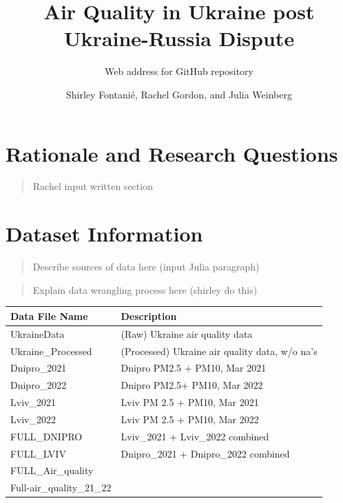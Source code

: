 \documentclass[
  12pt,
]{article}
\title{Air Quality in Ukraine post Ukraine-Russia Dispute}
\subtitle{Web address for GitHub repository}
\author{Shirley Fontanié, Rachel Gordon, and Julia Weinberg}
\date{}
\begin{document}
\maketitle

\newpage
\tableofcontents 
\newpage
\listoftables 
\newpage
\listoffigures 
\newpage

\hypertarget{rationale-and-research-questions}{%
\section{Rationale and Research
Questions}\label{rationale-and-research-questions}}

\begin{quote}
Rachel input written section
\end{quote}

\newpage

\hypertarget{dataset-information}{%
\section{Dataset Information}\label{dataset-information}}

\begin{quote}
Describe sources of data here (input Julia paragraph)
\end{quote}

\begin{quote}
Explain data wrangling process here (shirley do this)
\end{quote}

\begin{longtable}[]{@{}ll@{}}
\toprule
Data File Name & Description \\
\midrule
\endhead
UkraineData & (Raw) Ukraine air quality data \\
Ukraine\_Processed & (Processed) Ukraine air quality data, w/o na's \\
Dnipro\_2021 & Dnipro PM2.5 + PM10, Mar 2021 \\
Dnipro\_2022 & Dnipro PM2.5+ PM10, Mar 2022 \\
Lviv\_2021 & Lviv PM 2.5 + PM10, Mar 2021 \\
Lviv\_2022 & Lviv PM 2.5 + PM10, Mar 2022 \\
FULL\_DNIPRO & Lviv\_2021 + Lviv\_2022 combined \\
FULL\_LVIV & Dnipro\_2021 + Dnipro\_2022 combined \\
FULL\_Air\_quality & \\
Full-air\_quality\_21\_22 & \\
\bottomrule
\end{longtable}
\end{document}
